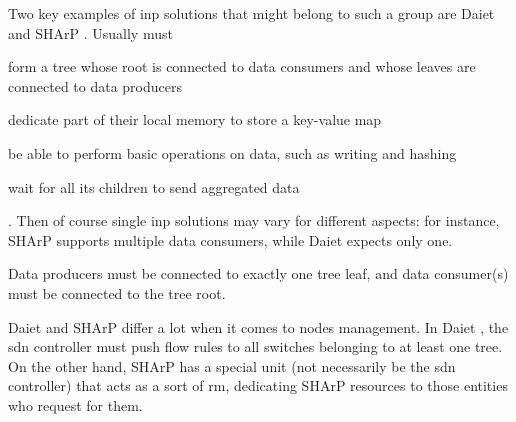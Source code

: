 Two key examples of \gls{inp} solutions that might belong to such a group are Daiet \cite{daiet} and SHArP \cite{sharp}.
Usually  must
\begin{mylist}
    \item form a tree whose root is connected to data consumers and whose leaves are connected to data producers
    \item dedicate part of their local memory to store a key-value map
    \item be able to perform basic operations on data, such as writing and hashing
    \item wait for all its children to send aggregated data
\end{mylist}.
Then of course single \gls{inp} solutions may vary for different aspects: for instance, SHArP \cite{sharp} supports multiple data consumers, while Daiet \cite{daiet} expects only one.

Data producers must be connected to exactly one tree leaf, and data consumer(s) must be connected to the tree root.

Daiet \cite{daiet} and SHArP \cite{sharp} differ a lot when it comes to nodes management.
In Daiet \cite{daiet}, the \gls{sdn} controller must push flow rules to all switches belonging to at least one tree.
On the other hand, SHArP \cite{sharp} has a special unit (not necessarily be the \gls{sdn} controller) that acts as a sort of \gls{rm}, dedicating SHArP \cite{sharp} resources to those entities who request for them.